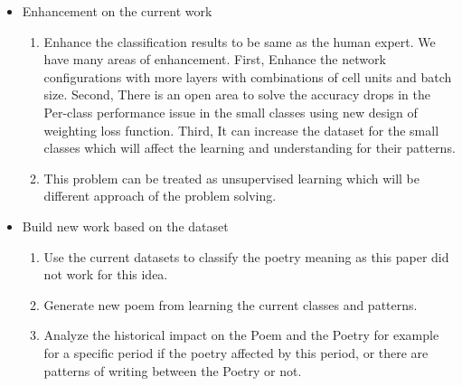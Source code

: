 \begin{itemize}
\item Enhancement on the current work
  \begin{enumerate}
  \item Enhance the classification results to be same as the human expert. We have many areas of enhancement. First, Enhance the network configurations with more layers with combinations of cell units and batch size. Second, There is an open area to solve the accuracy drops in the Per-class performance issue in the small classes using new design of weighting loss function. Third, It can increase the dataset for the small classes which will affect the learning and understanding for their patterns.
  \item This problem can be treated as unsupervised learning which will be different approach of the problem solving.
  \end{enumerate}
\item Build new work based on the dataset
  \begin{enumerate}
  \item Use the current datasets to classify the poetry meaning as this paper did not work for this idea.
  \item Generate new poem from learning the current classes and patterns.
    \item Analyze the historical impact on the Poem and the Poetry for example for a specific period if the poetry affected by this period, or there are patterns of writing between the Poetry or not.
\end{enumerate}
  
\end{itemize}



